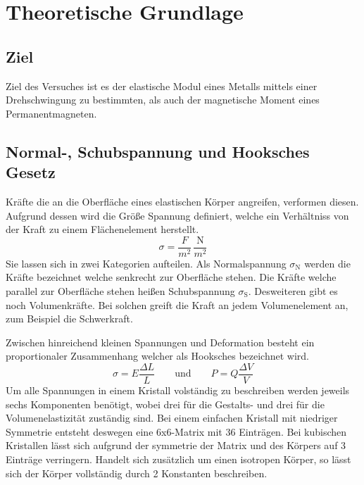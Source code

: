 \section{Theoretische Grundlage}
\label{sec:Theorie}
\subsection{Ziel}
Ziel des Versuches ist es der elastische Modul eines Metalls mittels einer Drehschwingung zu bestimmten, als auch der magnetische Moment eines Permanentmagneten.
\subsection{Normal-, Schubspannung und Hooksches Gesetz}
Kräfte die an die Oberfläche eines elastischen Körper angreifen, verformen diesen. Aufgrund dessen wird die Größe Spannung definiert, welche ein Verhältniss von der Kraft zu einem Flächenelement herstellt.
\begin{equation}
  \sigma = \frac{F}{m^2} \, \frac{\text{N}}{m^2}
  \label{eqn:Spannung}
\end{equation}
Sie lassen sich in zwei Kategorien aufteilen. Als Normalspannung $\sigma_\text{N}$ werden die Kräfte bezeichnet welche senkrecht zur Oberfläche stehen. Die Kräfte welche parallel zur Oberfläche stehen heißen Schubspannung $\sigma_\text{S}$. Desweiteren gibt es noch Volumenkräfte. Bei solchen greift die Kraft an jedem Volumenelement an, zum Beispiel die Schwerkraft.

Zwischen hinreichend kleinen Spannungen und Deformation besteht ein proportionaler Zusammenhang welcher als Hooksches bezeichnet wird.
\begin{equation}
  \sigma = E \frac{\Delta L}{L}  \hspace{2em} \text{und} \hspace{2em} P = Q\frac{\Delta V}{V}
  \label{eqn:Hook}
\end{equation}
Um alle Spannungen in einem Kristall volständig zu beschreiben werden jeweils sechs Komponenten benötigt, wobei drei für die Gestalts- und drei für die Volumenelastizität zuständig sind. Bei einem einfachen  Kristall mit niedriger Symmetrie entsteht deswegen eine 6x6-Matrix mit 36 Einträgen. Bei kubischen Kristallen lässt sich aufgrund der symmetrie der Matrix und des Körpers auf 3 Einträge verringern. Handelt sich zusätzlich um einen isotropen Körper, so lässt sich der Körper vollständig durch 2 Konstanten beschreiben.

